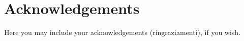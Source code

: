 \chapter*{Acknowledgements}

Here you may include your acknowledgements (ringraziamenti), if you wish.